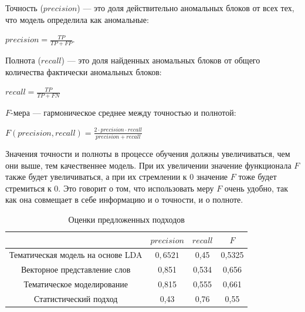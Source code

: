 \documentclass[12pt]{article}
\newcommand{\nextline}{\tabularnewline\hline}
\begin{document}
\par\begin{itemize}{
		\vspace{-0.2cm}\item Точность ($precision$) --- это доля действительно аномальных блоков от всех тех, что модель определила как аномальные:
		
		\begin{center}
			$precision =  \frac{TP}{TP + FP}$.
		\end{center}
		
		\vspace{-0.2cm}\item Полнота ($recall$) --- это доля найденных аномальных блоков от общего количества фактически аномальных блоков:
		
		\begin{center}
			$recall = \frac{TP}{TP + FN}$ 
		\end{center}
		
		\vspace{-0.2cm}\item $F$-мера --- гармоническое среднее между точностью и полнотой:
		
		\begin{center}
			$F(precision, recall) =  \frac{2 \cdot precision \cdot recall}{precision + recall}$
		\end{center}
}\end{itemize}

Значения точности и полноты в процессе обучения должны увеличиваться, чем они выше, тем качественнее модель. При их увеличении значение функционала $F$ также будет увеличиваться, а при их стремлении к $0$ значение $F$ тоже будет стремиться к $0$. Это говорит о том, что использовать меру $F$ очень удобно, так как она совмещает в себе информацию и о точности, и о полноте.

\begin{table}[h]
	\centering
	\vspace{-0.5cm}
	\caption{Оценки предложенных подходов}
	\vspace{0.2cm}
	\label{table3}
	\begin{tabular}{|c|c|c|c|}
		\hline
		& $precision$ & $recall$ & $F$      \nextline 
		Тематическая модель на основе LDA                          & $0,6521$    & 0,45   & 0,5325 \nextline 
		Векторное представление слов & 0,851     & 0,534  & 0,656  \nextline 
		Тематическое моделирование   & 0,815     & 0,555  & 0,661  \nextline 
		Статистический подход        & 0,43      & 0,76   & 0,55  \nextline
	\end{tabular}
\end{table}
\end{document}
